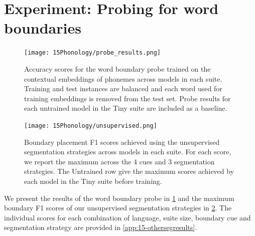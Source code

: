 \section{Experiment: Probing for word boundaries}


\begin{figure}[t]
    \centering
    \texttt{[image: 15Phonology/probe\_results.png]}
    \caption{Accuracy scores for the word boundary probe trained on the contextual embeddings of phonemes across models in each suite. Training and test instances are balanced and each word used for training embeddings is removed from the test set. Probe results for each untrained model in the Tiny suite are included as a baseline.}
    \label{fig:15-probes}
\end{figure}

\begin{figure}[t]
    \centering
    \texttt{[image: 15Phonology/unsupervised.png]}
    \caption{Boundary placement F1 scores achieved using the unsupervised segmentation strategies across models in each suite. For each score, we report the maximum across the 4 cues and 3 segmentation strategies. The Untrained row give the maximum scores achieved by each model in the Tiny suite before training.}
    \label{fig:15-unsupervised}
\end{figure}


We present the results of the word boundary probe in \cref{fig:15-probes} and the maximum boundary F1 scores of our unsupervised segmentation strategies in \cref{fig:15-unsupervised}. The individual scores for each combination of language, suite size, boundary cue and segmentation strategy are provided in \cref{app:15-othersegresults}. %

